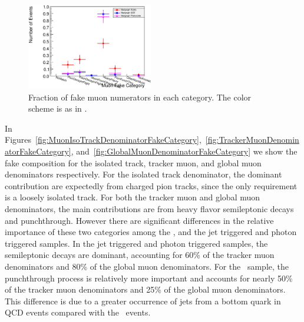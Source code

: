 \documentclass{cmspaper}
\begin{document}
\begin{figure}[htb]
\begin{center}
\includegraphics[width=0.49\textwidth]{plots/MuonNumeratorFakeCategory_Madgraph_WJetsVsQCD.eps}
   \caption{Fraction of fake muon numerators in each category. The color scheme is as in .}
   \label{fig:MuonNumerator_FakeCategory}
\end{center}
\end{figure}


In Figures~\ref{fig:MuonIsoTrackDenominatorFakeCategory},~\ref{fig:TrackerMuonDenominatorFakeCategory}, and~\ref{fig:GlobalMuonDenominatorFakeCategory} we show the fake composition for the isolated track, tracker muon, and global muon denominators respectively. For the isolated track denominator, the dominant contribution are expectedly from charged pion tracks, since the only requirement is a loosely isolated track. For both the tracker muon and global muon denominators, the main contributions are from heavy flavor semileptonic decays and punchthrough. However there are significant differences in the relative importance of these two categories among the \WPlusJets, and the jet triggered and photon triggered samples. In the jet triggered and photon triggered samples, the semileptonic decays are dominant, accounting for 60\% of the tracker muon denominators and 80\% of the global muon denominators. For the \WPlusJets\ sample, the punchthrough process is relatively more important and accounts for nearly 50\% of the tracker muon denominators and 25\% of the global muon denominators. This difference is due to a greater occurrence of jets from a bottom quark in QCD events compared with the \WPlusJets\ events. 
\end{document}
